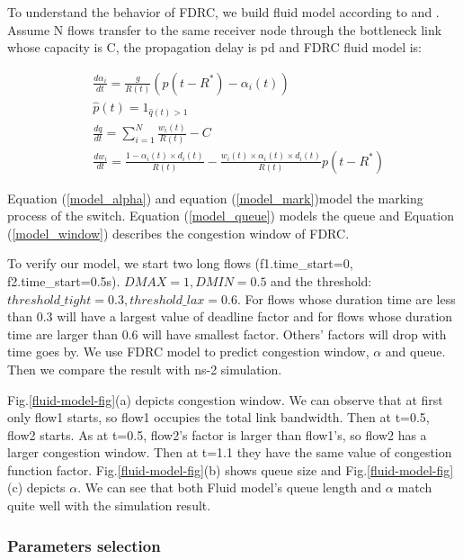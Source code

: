 \documentclass[10pt, conference, letterpaper]{IEEEtran}
\begin{document}
To understand the behavior of FDRC, we build fluid model according to \cite{DCTCPAnalysis} and \cite{TCPfluid}.
Assume N flows transfer to the same receiver node through the bottleneck link whose capacity is C, the propagation delay
is pd and FDRC fluid model is:

\begin{align}
&\frac{d\alpha_i}{dt}=\frac{g}{R(t)}(p(t-R^*)-\alpha_i(t)) \label{model_alpha} \\
&\widehat{p}(t)=1_{\widehat{q}(t)>1}  \label{model_mark} \\
&\frac{dq}{dt}= \sum_{i=1}^N{\frac{w_i(t)}{R(t)}}-C \label{model_queue}  \\
&\frac{dw_i}{dt}=\frac{1-\alpha_i(t)\times d_{i}(t)}{R(t)}-\frac{w_i(t) \times \alpha_i(t)\times d_i(t)}{R(t)}p(t-R^*)  \label{model_window}
\end{align}

Equation (\ref{model_alpha})  and equation (\ref{model_mark})model the marking process of the switch.
Equation (\ref{model_queue}) models the queue and
Equation (\ref{model_window}) describes the congestion window of FDRC.



To verify our model, we start two long flows (f1.time\_start=0, f2.time\_start=0.5s). $DMAX=1,DMIN=0.5$ and the threshold: 
$threshold\_tight=0.3, threshold\_lax=0.6$. 
For flows whose duration time are less than 0.3 will have a largest value of deadline factor and
for flows whose duration time are larger than 0.6 will have smallest factor. 
Others' factors will drop with time goes by.
We use FDRC model to predict congestion window, $\alpha$ and queue. Then we compare the result with ns-2 simulation. 


Fig.\ref{fluid-model-fig}(a) depicts congestion window. We can observe that at first only flow1 starts, so flow1 occupies the total link bandwidth. Then at t=0.5, flow2 starts. 
As at t=0.5, flow2's factor is larger than flow1's, so flow2 has a larger congestion window. 
Then at t=1.1 they have the same value of congestion function factor.
Fig.\ref{fluid-model-fig}(b) shows queue size and Fig.\ref{fluid-model-fig}(c) depicts $\alpha$.  We can see that both Fluid model's queue length and $\alpha$
match quite well with the simulation result.

\subsubsection{Parameters selection}
\end{document}
